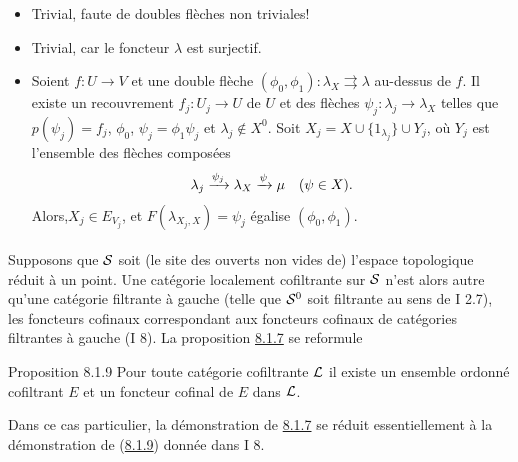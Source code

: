 \documentclass[10pt]{../fichiers-configuration-latex/smfart}
\begin{document}
\begin{itemize}
\item[(iii) \emph{axiome} $(\Ll3)$] Trivial, faute de doubles
  flèches non triviales!

\item[(iv) \emph{axiome} $(C \mathfrak{F} 1)$] Trivial, car le foncteur
  $\lambda$ est surjectif.

\item[((v) \emph{axiome} $(C \mathfrak{F} 2)$] Soient $f : U \to V$ et
 une double
 flèche $(\phi_{0}, \phi_{1}) : \lambda_X \rightrightarrows \lambda$
 au-dessus de $f$. Il existe un recouvrement $f_j : U_j \to U$ de $U$
 et des flèches $\psi_j : \lambda_j \to \lambda_X$ telles que
 $p(\psi_j) = f_j$, $\phi_{0}$, $\psi_j = \phi_1 \psi_j$ et $\lambda_j
 \not\in X^{0}$. Soit $X_j = X \cup \{1_{\lambda_{j}}\} \cup
 Y_j$, où $Y_j$ est l'ensemble des flèches composées
$$
\lambda_j \xrightarrow[]{\psi_j} \lambda_X \xrightarrow{\psi} \mu\quad
(\psi \in X){}.
$$
Alors,\pageoriginale $X_j \in E_{V_{j}}$, et $F(\lambda_{X_{j}, X}) = \psi_j$
égalise $(\phi_0, \phi_1)$.
\end{itemize}

\setcounter{subsubsection}{9}
\setcounter{paragraph}{-1}
\paragraph{}

Supposons que ${\mathcal S}$ soit (le site des ouverts non vides de) l'espace
topologique réduit à un point. Une catégorie localement
cofiltrante sur ${\mathcal S}$ n'est alors autre qu'une catégorie filtrante à
gauche (\ie telle que ${\mathcal S}^{0}$ soit filtrante au sens de I 2.7),
les foncteurs cofinaux correspondant aux foncteurs cofinaux de
catégories filtrantes à gauche (I 8). La proposition \hyperref[V.prop8.1.7]{8.1.7} se
reformule

\begin{enonce*}{Proposition 8.1.9}
Pour toute catégorie cofiltrante ${\mathcal L}$ il existe un ensemble ordonné
cofiltrant $E$ et un foncteur cofinal de $E$ dans ${\mathcal L}$.
\end{enonce*}

Dans ce cas particulier, la démonstration de \hyperref[V.prop8.1.7]{8.1.7} se réduit
essentiellement à la démonstration de (\hyperref[V.prop8.1.9]{8.1.9}) donnée dans I 8.
\end{document}
